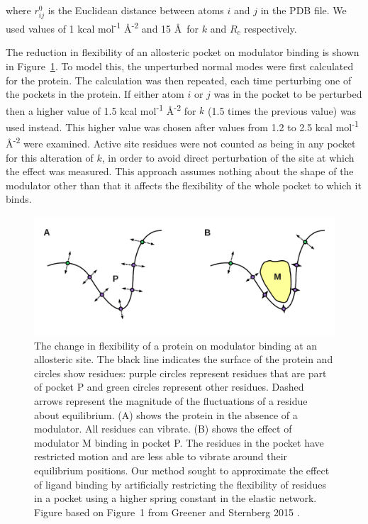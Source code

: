 where $r_{ij}^{0}$ is the Euclidean distance between atoms $i$ and $j$ in the PDB file.
We used values of 1 kcal mol\textsuperscript{-1} \AA\textsuperscript{-2} and 15 \AA\ for $k$ and $R_{c}$ respectively.

The reduction in flexibility of an allosteric pocket on modulator binding is shown in Figure~\ref{fig:ligand_binding}.
To model this, the unperturbed normal modes were first calculated for the protein.
The calculation was then repeated, each time perturbing one of the pockets in the protein.
If either atom $i$ or $j$ was in the pocket to be perturbed then a higher value of 1.5 kcal mol\textsuperscript{-1} \AA\textsuperscript{-2} for $k$ (1.5 times the previous value) was used instead.
This higher value was chosen after values from 1.2 to 2.5 kcal mol\textsuperscript{-1} \AA\textsuperscript{-2} were examined.
Active site residues were not counted as being in any pocket for this alteration of $k$, in order to avoid direct perturbation of the site at which the effect was measured.
This approach assumes nothing about the shape of the modulator other than that it affects the flexibility of the whole pocket to which it binds.


\begin{figure}
\centering

\includegraphics[width=\textwidth]{figures/ligand_binding/ligand_binding}

\caption[The change in flexibility of a protein on modulator binding at an allosteric site used as the basis for AlloPred]
{The change in flexibility of a protein on modulator binding at an allosteric site.
The black line indicates the surface of the protein and circles show residues: purple circles represent residues that are part of pocket P and green circles represent other residues.
Dashed arrows represent the magnitude of the fluctuations of a residue about equilibrium.
(A) shows the protein in the absence of a modulator.
All residues can vibrate.
(B) shows the effect of modulator M binding in pocket P.
The residues in the pocket have restricted motion and are less able to vibrate around their equilibrium positions.
Our method sought to approximate the effect of ligand binding by artificially restricting the flexibility of residues in a pocket using a higher spring constant in the elastic network.
Figure based on Figure~1 from Greener and Sternberg 2015 \cite{Greener2015}.}

\label{fig:ligand_binding}
\end{figure}


